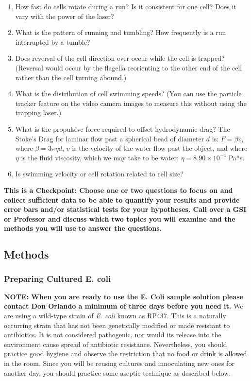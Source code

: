 \documentclass{../lab}
\begin{document}
\begin{enumerate}
    \item How fast do cells rotate during a run? Is it consistent for one cell? Does it vary with the power of the laser?

    \item What is the pattern of running and tumbling? How frequently is a run interrupted by a tumble?

    \item Does reversal of the cell direction ever occur while the cell is trapped? (Reversal would occur by the flagella reorienting to the other end of the cell rather than the cell turning abound.)

    \item What is the distribution of cell swimming speeds? (You can use the particle tracker feature on the video camera images to measure this without using the trapping laser.)

    \item What is the propulsive force required to offset hydrodynamic drag? The Stoke's Drag for laminar flow past a spherical bead of diameter $d$ is: $F = \beta v$, where $\beta = 3\pi\eta d$, $v$ is the velocity of the water flow past the object, and where $\eta$ is the fluid viscosity, which we may take to be water: $\eta = 8.90 \times 10^{-4}$ Pa*s.

    \item Is swimming velocity or cell rotation related to cell size?

\end{enumerate}


\textbf{This is a Checkpoint: Choose one or two questions to focus on and collect sufficient data to be able to quantify your results and provide error bars and/or statistical tests for your hypotheses. Call over a GSI or Professor and discuss which two topics you will examine and the methods you will use to answer the questions.}

\subsection{Methods}

\subsubsection{Preparing Cultured E. coli}

\textbf{NOTE: When you are ready to use the E. Coli sample solution please contact Don Orlando a minimum of three days before you need it.} We are using a wild-type strain of \emph{E. coli} known as RP437. This is a naturally occurring strain that has not been genetically modified or made resistant to antibiotics. It is not considered pathogenic, nor would its release into the environment cause spread of antibiotic resistance. Nevertheless, you should practice good hygiene and observe the restriction that no food or drink is allowed in the room. Since you will be reusing cultures and innoculating new ones for another day, you should practice some aseptic technique as described below.
\end{document}

